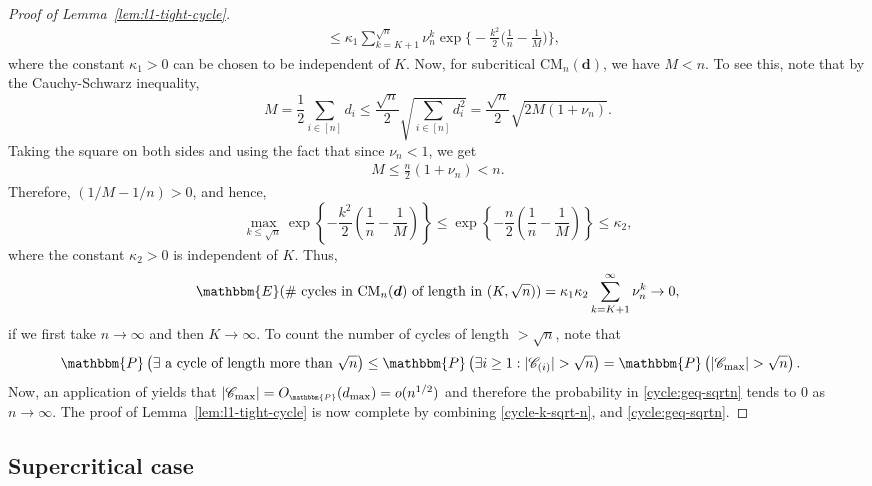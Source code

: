 \documentclass[11pt,a4paper, reqno]{article}
\numberwithin{equation}{section}
\numberwithin{equation}{section}
\def\sss{\scriptscriptstyle}
\newcommand{\prob}[1]{\ensuremath{\mathbbm{P}\left(#1\right)}}
\newcommand{\PR}{\ensuremath{\mathbbm{P}}}
\newcommand{\1}{\ensuremath{\mathbbm{1}}}
\newcommand{\OP}{\ensuremath{O_{\sss\PR}}}
\numberwithin{equation}{section}
\numberwithin{theorem}{section}
\begin{document}
\begin{proof}[{Proof of Lemma~\ref{lem:l1-tight-cycle}}]
\begin{align}
&\leq \kappa_1\sum_{k=K+1}^{\sqrt{n}} \nu_n^k\exp\bigg\{-\frac{k^2}{2}\Big(\frac{1}{n}-\frac{1}{M}\Big)\bigg\}, \nonumber
\end{align}where the constant $\kappa_1>0$ can be chosen to be independent of $K$.
Now, for subcritical $\mathrm{CM}_n(\boldsymbol{d})$, we have $M<n$. To see this, note that by the Cauchy-Schwarz inequality,
  \begin{equation}
   M=\frac{1}{2} \sum_{i\in [n]}d_i \leq \frac{\sqrt{n}}{2}\sqrt{\sum_{i\in [n]}d_i^2}= \frac{\sqrt{n}}{2}\sqrt{2M(1+\nu_n)}.
  \end{equation}
  Taking the square on both sides and using the fact that since $\nu_n< 1$, we get
  \begin{align*}
  M\leq \frac{n}{2}(1+\nu_n)< n.
  \end{align*}
  Therefore, $(1/M-1/n)>0$, and hence,
  $$\max_{k\leq \sqrt{n}}\exp\left\{-\frac{k^2}{2}\left(\frac{1}{n}-\frac{1}{M}\right)\right\}\leq \exp\left\{-\frac{n}{2}\left(\frac{1}{n}-\frac{1}{M}\right)\right\}\leq \kappa_2, $$where the constant $\kappa_2>0$ is independent of $K$. 
  Thus,
  \begin{equation}\label{cycle-k-sqrt-n}
  \mathbbm{E}(\#\mbox{ cycles in }\mathrm{CM}_n(\boldsymbol{d}) \text{ of length in }  (K,\sqrt{n}))=\kappa_1\kappa_2\sum_{k=K+1}^{\infty}\nu_n^k\to 0,
  \end{equation}if we first take $n\to\infty$ and then $K\to\infty$.
  To count the number of cycles of length $>\sqrt{n}$, note that
  \begin{equation}\label{cycle:geq-sqrtn}
   \begin{split} 
   &\prob{\exists\text{ a cycle of length more than } \sqrt{n}}\leq \prob{\exists i\geq 1: |\mathscr{C}_{(i)}|>\sqrt{n}}= \prob{|\mathscr{C}_{\max} |>\sqrt{n}}.
   \end{split}
  \end{equation}  
Now, an application of \cite[Theorem 1.3]{J08} yields that $|\mathscr{C}_{\max}| = \OP(d_{\max})=o(n^{1/2})$ and therefore the probability in \eqref{cycle:geq-sqrtn} tends to 0 as $n\to \infty$. 
The proof of Lemma~\ref{lem:l1-tight-cycle} is now complete by combining \eqref{cycle-k-sqrt-n}, and \eqref{cycle:geq-sqrtn}.
\end{proof}
\subsection{Supercritical case}\label{ssec:maxcut-sup}
\end{document}
